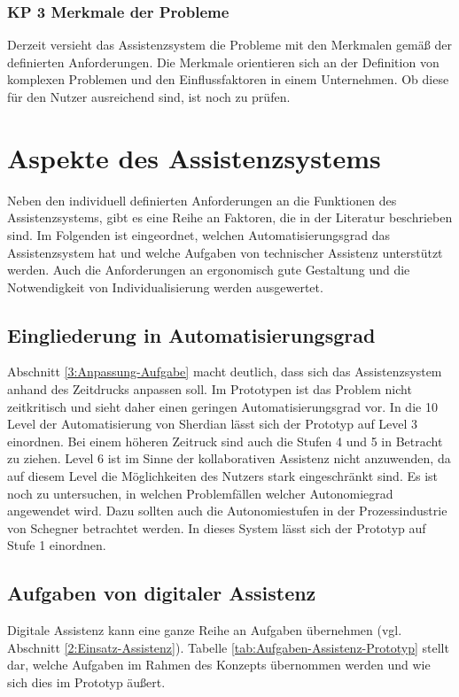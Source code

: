 \subsubsection*{KP 3 Merkmale der Probleme}
Derzeit versieht das Assistenzsystem die Probleme mit den Merkmalen gemäß der definierten Anforderungen. Die Merkmale orientieren sich an der Definition von komplexen Problemen und den Einflussfaktoren in einem Unternehmen. Ob diese für den Nutzer ausreichend sind, ist noch zu prüfen.

\section{Aspekte des Assistenzsystems}
Neben den individuell definierten Anforderungen an die Funktionen des Assistenzsystems, gibt es eine Reihe an Faktoren, die in der Literatur beschrieben sind. Im Folgenden ist eingeordnet, welchen Automatisierungsgrad das Assistenzsystem hat und welche Aufgaben von technischer Assistenz unterstützt werden. Auch die Anforderungen an ergonomisch gute Gestaltung und die Notwendigkeit von Individualisierung werden ausgewertet.

\subsection*{Eingliederung in Automatisierungsgrad}
Abschnitt \ref{3:Anpassung-Aufgabe} macht deutlich, dass sich das Assistenzsystem anhand des Zeitdrucks anpassen soll. Im Prototypen ist das Problem nicht zeitkritisch und sieht daher einen geringen Automatisierungsgrad vor. In die 10 Level der Automatisierung von Sherdian \cite{Wandke2005} lässt sich der Prototyp auf Level 3 einordnen. Bei einem höheren Zeitruck sind auch die Stufen 4 und 5 in Betracht zu ziehen. Level 6 ist im Sinne der kollaborativen Assistenz nicht anzuwenden, da auf diesem Level die Möglichkeiten des Nutzers stark eingeschränkt sind. Es ist noch zu untersuchen, in welchen Problemfällen welcher Autonomiegrad angewendet wird. Dazu sollten auch die Autonomiestufen in der Prozessindustrie von Schegner \cite{Schegner2017} betrachtet werden. In dieses System lässt sich der Prototyp auf Stufe 1 einordnen.

\subsection*{Aufgaben von digitaler Assistenz}
Digitale Assistenz kann eine ganze Reihe an Aufgaben übernehmen (vgl. Abschnitt \ref{2:Einsatz-Assistenz}). Tabelle \ref{tab:Aufgaben-Assistenz-Prototyp} stellt dar, welche Aufgaben im Rahmen des Konzepts übernommen werden und wie sich dies im Prototyp äußert.


